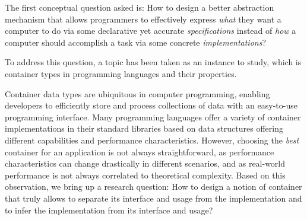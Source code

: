 
\begin{center}
\vspace{-0.7em}
\vspace{-0.3em}
\end{center}

The first conceptual question asked is: 
How to design a better abstraction mechanism that allows programmers to effectively express \emph{what} they want a computer to do via some declarative yet accurate \emph{specifications} instead of \emph{how} a computer should accomplish a task via some concrete \emph{implementations}?

To address this question, a topic has been taken as an instance to study, which is container types in programming languages and their properties. 

Container data types are ubiquitous in computer programming, enabling developers to efficiently store and process collections of data with an easy-to-use programming interface.
Many programming languages offer a variety of container implementations in their standard libraries based on data structures offering different capabilities and performance characteristics.
However, choosing the \emph{best} container for an application is not always straightforward, as performance characteristics can change drastically in different scenarios, and as real-world performance is not always correlated to theoretical complexity. Based on this observation, we bring up a research question: How to design a notion of container that truly allows to separate its interface and usage from the implementation and to infer the implementation from its interface and usage?

